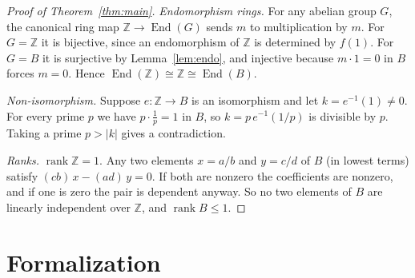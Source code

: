 \documentclass[11pt]{article}
\theoremstyle{plain}
\theoremstyle{definition}
\theoremstyle{remark}
\newcommand{\Z}{\mathbb Z}
\newcommand{\End}{\operatorname{End}}
\begin{document}
\begin{proof}[Proof of Theorem~\ref{thm:main}]
\emph{Endomorphism rings.} For any abelian group $G$, the canonical ring map
$\Z\to\End(G)$ sends $m$ to multiplication by $m$. For $G=\Z$ it is bijective, since an
endomorphism of $\Z$ is determined by $f(1)$. For $G=B$ it is surjective by
Lemma~\ref{lem:endo}, and injective because $m\cdot1=0$ in $B$ forces $m=0$. Hence
$\End(\Z)\cong\Z\cong\End(B)$.

\emph{Non-isomorphism.} Suppose $e\colon\Z\to B$ is an isomorphism and let
$k=e^{-1}(1)\ne0$. For every prime $p$ we have $p\cdot\frac1p=1$ in $B$, so
$k=p\,e^{-1}(1/p)$ is divisible by $p$. Taking a prime $p>|k|$ gives a contradiction.

\emph{Ranks.} $\operatorname{rank}\Z=1$. Any two elements $x=a/b$ and $y=c/d$ of $B$
(in lowest terms) satisfy $(cb)\,x-(ad)\,y=0$. If both are nonzero the coefficients
are nonzero, and if one is zero the pair is dependent anyway. So no two elements of $B$
are linearly independent over $\Z$, and $\operatorname{rank}B\le1$.
\end{proof}

\section{Formalization}
\end{document}
